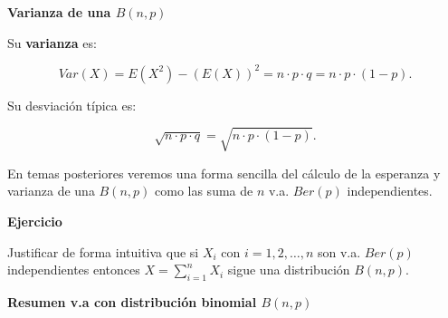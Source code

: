 \documentclass[]{book}
\begin{document}
\textbf{Varianza de una \(B(n,p)\)}

Su \textbf{varianza} es:

\[Var(X)=E(X^2)-\left(E(X)\right)^2=n\cdot p \cdot q=n\cdot p\cdot (1-p).\]

Su desviación típica es:

\[\sqrt{n\cdot p\cdot q}=\sqrt{n\cdot p\cdot (1-p)}.\]

En temas posteriores veremos una forma sencilla del cálculo de la esperanza y varianza de una \(B(n,p)\) como las suma de \(n\) v.a. \(Ber(p)\) independientes.

\textbf{Ejercicio}

Justificar de forma intuitiva que si \(X_i\) con \(i=1,2,\ldots, n\) son v.a. \(Ber(p)\) independientes entonces \(X=\displaystyle\sum_{i=1}^n X_i\) sigue una distribución \(B(n,p).\)

\textbf{Resumen v.a con distribución binomial \(B(n,p)\)}
\end{document}
